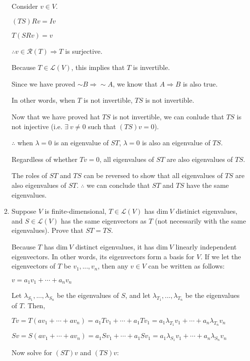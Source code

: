 \documentclass[fleqn]{article}
\begin{document}
\begin{enumerate}[nolistsep]
			Consider $v \in V$.
			
			$(TS)Rv = Iv$
			
			$T(SRv) = v$
			
			$\therefore v \in \mathcal{R}(T) \Rightarrow T$ is surjective.
			
			Because $T \in \mathcal{L}(V)$, this implies that $T$ is invertible.
			
			Since we have proved ${\sim}B \Rightarrow {\sim}A$, we know that $A \Rightarrow B$ is also true.
			
			In other words, when $T$ is not invertible, $TS$ is not invertible.
			
			Now that we have proved hat $TS$ is not invertible, we can conlude that $TS$ is not injective (i.e. $\exists\ v \neq 0$ such that $(TS)v = 0$).
			
			$\therefore$ when $\lambda = 0$ is an eigenvalue of $ST$, $\lambda = 0$ is also an eigenvalue of $TS$.
			
			Regardless of whether $Tv = 0$, all eigenvalues of $ST$ are also eigenvalues of $TS$. 
			
			The roles of $ST$ and $TS$ can be reversed to show that all eigenvalues of $TS$ are also eigenvalues of $ST$. $\therefore$ we can conclude that $ST$ and $TS$ have the same eigenvalues.
			
			\item Suppose $V$ is finite-dimensional, $T \in \mathcal{L}(V)$ has $\text{dim}\ V$ distinict eigenvalues, and $S \in \mathcal{L}(V)$ has the same eigenvectors as $T$ (not necessarily with the same eigenvalues). Prove that $ST = TS$.
			
			Because $T$ has $\text{dim}\ V$ distinct eigenvalues, it has $\text{dim}\ V$ linearly independent eigenvectors. In other words, its eigenvectors form a basis for $V$. If we let the eigenvectors of $T$ be $v_1,...,v_n$, then any $v \in V$ can be written as follows:
			
			$v = a_1v_1 + \cdots + a_nv_n$
			
			Let $\lambda_{S_1},...,\lambda_{S_n}$ be the eigenvalues of $S$, and let $\lambda_{T_1},...,\lambda_{T_n}$ be the eigenvalues of $T$. Then, 
			
			$Tv = T(av_1 + \cdots + av_n) = a_1Tv_1 + \cdots + a_1Tv_1 = a_1\lambda_{T_1}v_1 + \cdots + a_n\lambda_{T_n}v_n$
			
			$Sv = S(av_1 + \cdots + av_n) = a_1Sv_1 + \cdots + a_1Sv_1 = a_1\lambda_{S_1}v_1 + \cdots + a_n\lambda_{S_n}v_n$
			
			Now solve for $(ST)v$ and $(TS)v$:
			

\end{enumerate}
\end{document}
